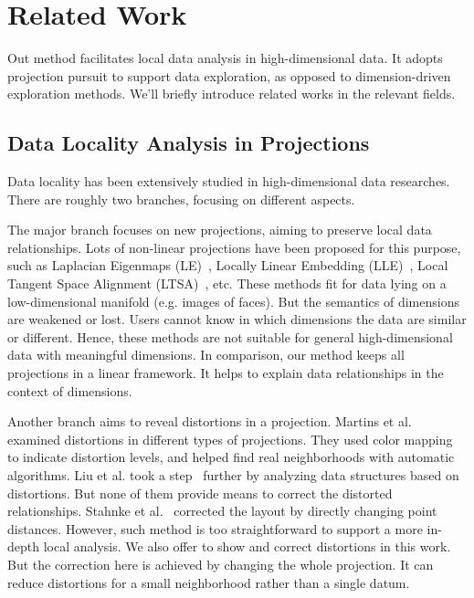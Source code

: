 \section{Related Work}
\label{section:relatedwork}
Out method facilitates local data analysis in high-dimensional data. It adopts projection pursuit to support data exploration, as opposed to dimension-driven exploration methods. We'll briefly introduce related works in the relevant fields.

\subsection{Data Locality Analysis in Projections}
Data locality has been extensively studied in high-dimensional data researches. There are roughly two branches, focusing on different aspects.

The major branch focuses on new projections, aiming to preserve local data relationships. Lots of non-linear projections have been proposed for this purpose, such as Laplacian Eigenmaps (LE)~\cite{DBLP:journals/neco/BelkinN03}, Locally Linear Embedding (LLE)~\cite{roweis2000nonlinear}, Local Tangent Space Alignment (LTSA)~\cite{DBLP:journals/corr/cs-LG-0212008}, etc. These methods fit for data lying on a low-dimensional manifold (e.g. images of faces). But the semantics of dimensions are weakened or lost. Users cannot know in which dimensions the data are similar or different. Hence, these methods are not suitable for general high-dimensional data with meaningful dimensions. In comparison, our method keeps all projections in a linear framework. It helps to explain data relationships in the context of dimensions.

Another branch aims to reveal distortions in a projection. Martins et al.~\cite{DBLP:journals/cg/MartinsCMT14} examined distortions in different types of projections. They used color mapping to indicate distortion levels, and helped find real neighborhoods with automatic algorithms. Liu et al. took a step~\cite{DBLP:journals/cgf/LiuWBP14} further by analyzing data structures based on distortions. But none of them provide means to correct the distorted relationships. Stahnke et al.~\cite{DBLP:journals/tvcg/StahnkeDMT16} corrected the layout by directly changing point distances. However, such method is too straightforward to support a more in-depth local analysis. We also offer to show and correct distortions in this work. But the correction here is achieved by changing the whole projection. It can reduce distortions for a small neighborhood rather than a single datum.

